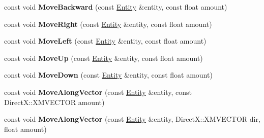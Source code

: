 \begin{DoxyCompactItemize}
\item 
const void {\bfseries Move\+Backward} (const \hyperlink{struct_ensum_1_1_components_1_1_entity}{Entity} \&entity, const float amount)\hypertarget{class_ensum_1_1_components_1_1_transform_manager_a7a9d054f27c3b05bd8622e88f476142c}{}\label{class_ensum_1_1_components_1_1_transform_manager_a7a9d054f27c3b05bd8622e88f476142c}

\item 
const void {\bfseries Move\+Right} (const \hyperlink{struct_ensum_1_1_components_1_1_entity}{Entity} \&entity, const float amount)\hypertarget{class_ensum_1_1_components_1_1_transform_manager_a9155f3880b1ac2ef76fbf2e77d56537c}{}\label{class_ensum_1_1_components_1_1_transform_manager_a9155f3880b1ac2ef76fbf2e77d56537c}

\item 
const void {\bfseries Move\+Left} (const \hyperlink{struct_ensum_1_1_components_1_1_entity}{Entity} \&entity, const float amount)\hypertarget{class_ensum_1_1_components_1_1_transform_manager_a9e65ded7e7f3eb7415534c8e25f75502}{}\label{class_ensum_1_1_components_1_1_transform_manager_a9e65ded7e7f3eb7415534c8e25f75502}

\item 
const void {\bfseries Move\+Up} (const \hyperlink{struct_ensum_1_1_components_1_1_entity}{Entity} \&entity, const float amount)\hypertarget{class_ensum_1_1_components_1_1_transform_manager_a41e6739af3127f254d0ba4b3d6d5467b}{}\label{class_ensum_1_1_components_1_1_transform_manager_a41e6739af3127f254d0ba4b3d6d5467b}

\item 
const void {\bfseries Move\+Down} (const \hyperlink{struct_ensum_1_1_components_1_1_entity}{Entity} \&entity, const float amount)\hypertarget{class_ensum_1_1_components_1_1_transform_manager_a675ee13a589930176c0b5bf4c3fa0a04}{}\label{class_ensum_1_1_components_1_1_transform_manager_a675ee13a589930176c0b5bf4c3fa0a04}

\item 
const void {\bfseries Move\+Along\+Vector} (const \hyperlink{struct_ensum_1_1_components_1_1_entity}{Entity} \&entity, const Direct\+X\+::\+X\+M\+V\+E\+C\+T\+OR amount)\hypertarget{class_ensum_1_1_components_1_1_transform_manager_a243adff170f09f90e170cdce154c1434}{}\label{class_ensum_1_1_components_1_1_transform_manager_a243adff170f09f90e170cdce154c1434}

\item 
const void {\bfseries Move\+Along\+Vector} (const \hyperlink{struct_ensum_1_1_components_1_1_entity}{Entity} \&entity, Direct\+X\+::\+X\+M\+V\+E\+C\+T\+OR dir, float amount)\hypertarget{class_ensum_1_1_components_1_1_transform_manager_a53f28a815293ffa0c2f07d03a594c54e}{}\label{class_ensum_1_1_components_1_1_transform_manager_a53f28a815293ffa0c2f07d03a594c54e}


\end{DoxyCompactItemize}
